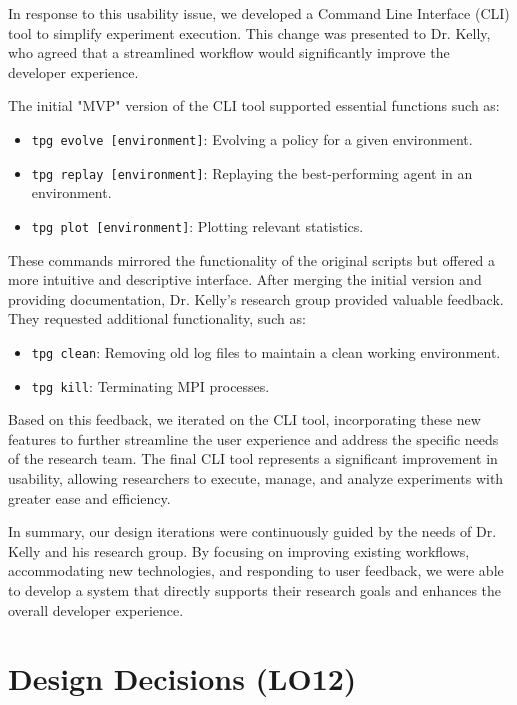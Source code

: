 \documentclass{article}
\begin{document}
In response to this usability issue, we developed a Command Line Interface (CLI) tool to simplify experiment execution. This change was presented to Dr. Kelly, who agreed that a streamlined workflow would significantly improve the developer experience.

The initial "MVP" version of the CLI tool supported essential functions such as:

\begin{itemize}
    \item \texttt{tpg evolve [environment]}: Evolving a policy for a given environment.
    \item \texttt{tpg replay [environment]}: Replaying the best-performing agent in an environment.
    \item \texttt{tpg plot [environment]}: Plotting relevant statistics.
\end{itemize}

These commands mirrored the functionality of the original scripts but offered a more intuitive and descriptive interface. After merging the initial version and providing documentation, Dr. Kelly's research group provided valuable feedback. They requested additional functionality, such as:

\begin{itemize}
    \item \texttt{tpg clean}: Removing old log files to maintain a clean working environment.
    \item \texttt{tpg kill}: Terminating MPI processes.
\end{itemize}

Based on this feedback, we iterated on the CLI tool, incorporating these new features to further streamline the user experience and address the specific needs of the research team. The final CLI tool represents a significant improvement in usability, allowing researchers to execute, manage, and analyze experiments with greater ease and efficiency.

In summary, our design iterations were continuously guided by the needs of Dr. Kelly and his research group. By focusing on improving existing workflows, accommodating new technologies, and responding to user feedback, we were able to develop a system that directly supports their research goals and enhances the overall developer experience.


\section{Design Decisions (LO12)}
\end{document}
